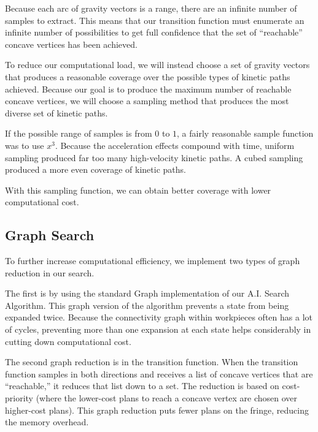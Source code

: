 Because each arc of gravity vectors is a range, there are an infinite number of samples to extract. This means that our transition function must enumerate an infinite number of possibilities to get full confidence that the set of ``reachable'' concave vertices has been achieved.

To reduce our computational load, we will instead choose a set of gravity vectors that produces a reasonable coverage over the possible types of kinetic paths achieved. Because our goal is to produce the maximum number of reachable concave vertices, we will choose a sampling method that produces the most diverse set of kinetic paths.

If the possible range of samples is from $0$ to $1$, a fairly reasonable sample function was to use $x^3$. Because the acceleration effects compound with time, uniform sampling produced far too many high-velocity kinetic paths. A cubed sampling produced a more even coverage of kinetic paths.



With this sampling function, we can obtain better coverage with lower computational cost.

	\subsection{Graph Search}

To further increase computational efficiency, we implement two types of graph reduction in our search.

The first is by using the standard Graph implementation of our A.I. Search Algorithm. This graph version of the algorithm prevents a state from being expanded twice. Because the connectivity graph within workpieces often has a lot of cycles, preventing more than one expansion at each state helps considerably in cutting down computational cost.

The second graph reduction is in the transition function. When the transition function samples in both directions and receives a list of concave vertices that are ``reachable,'' it reduces that list down to a set. The reduction is based on cost-priority (where the lower-cost plans to reach a concave vertex are chosen over higher-cost plans). This graph reduction puts fewer plans on the fringe, reducing the memory overhead.

